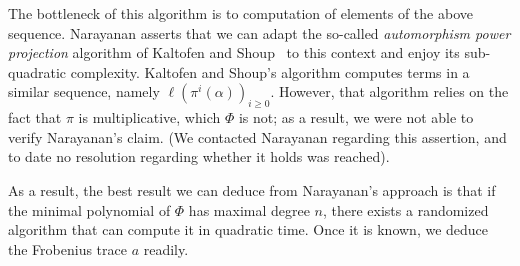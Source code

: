 \documentclass[sigconf]{acmart}
\newtheorem{theorem}{Theorem}
\newcommand{\F}{\mathbb{F}}
\newcommand{\minpol}{\textnormal{MinPoly}_{\mathbb{F}_q}}
\begin{document}
The bottleneck of this algorithm is to computation of elements of the
above sequence. Narayanan asserts that we can adapt the so-called {\em
  automorphism power projection} algorithm of Kaltofen and
Shoup~\cite{KaSh98} to this context and enjoy its sub-quadratic
complexity. Kaltofen and Shoup's algorithm computes terms in a similar
sequence, namely $\ell(\pi^i(\alpha))_{i\ge 0}$. However, that
algorithm relies on the fact that $\pi$ is multiplicative, which
$\Phi$ is not; as a result, we were not able to verify Narayanan's
claim. (We contacted Narayanan regarding this assertion, and to date
no resolution regarding whether it holds was reached).

As a result, the best result we can deduce from Narayanan's approach
is that if the minimal polynomial of $\Phi$ has maximal degree $n$,
there exists a randomized algorithm that can compute it in quadratic
time. Once it is known, we deduce the Frobenius trace $a$ readily.




\end{document}
